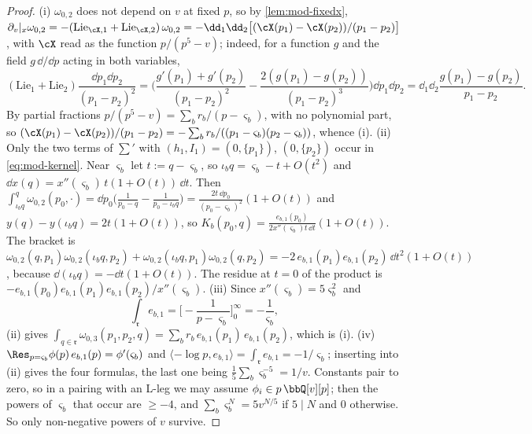\begin{proof}
(i) $\omega_{0,2}$ does not depend on $v$ at fixed $p$, so by \cref{lem:mod-fixedx}, $\partial_v|_x\omega_{0,2}=-(\mathrm{Lie}_{\cX,1}+\mathrm{Lie}_{\cX,2})\,\omega_{0,2}=-\dd_1\dd_2\big[(\cX(p_1)-\cX(p_2))/(p_1-p_2)\big]$, with $\cX$ read as the function $p/(p^5-v)$; indeed, for a function $g$ and the field $g\,\dd/\dd p$ acting in both variables,
\[
(\mathrm{Lie}_{1}+\mathrm{Lie}_{2})\frac{\dd p_1\dd p_2}{(p_1-p_2)^2}=\Big(\frac{g'(p_1)+g'(p_2)}{(p_1-p_2)^2}-\frac{2(g(p_1)-g(p_2))}{(p_1-p_2)^3}\Big)\dd p_1\dd p_2=\dd_1\dd_2\frac{g(p_1)-g(p_2)}{p_1-p_2}.
\]
By partial fractions $p/(p^5-v)=\sum_br_b/(p-\varsigma_b)$, with no polynomial part, so $(\cX(p_1)-\cX(p_2))/(p_1-p_2)=-\sum_br_b/((p_1-\varsigma_b)(p_2-\varsigma_b))$, whence (i).
(ii) Only the two terms of ${\sum}'$ with $(h_1,I_1)=(0,\{p_1\})$, $(0,\{p_2\})$ occur in \eqref{eq:mod-kernel}. Near $\varsigma_b$ let $t:=q-\varsigma_b$, so $\iota_bq=\varsigma_b-t+O(t^2)$ and $\dd x(q)=x''(\varsigma_b)\,t(1+O(t))\,\dd t$. Then $\int_{\iota_bq}^q\omega_{0,2}(p_0,\cdot)=\dd p_0\Big(\frac1{p_0-q}-\frac1{p_0-\iota_bq}\Big)=\frac{2t\,\dd p_0}{(p_0-\varsigma_b)^2}(1+O(t))$ and $y(q)-y(\iota_bq)=2t(1+O(t))$, so $K_b(p_0,q)=\frac{e_{b,1}(p_0)}{2x''(\varsigma_b)t\,\dd t}(1+O(t))$. The bracket is $\omega_{0,2}(q,p_1)\omega_{0,2}(\iota_bq,p_2)+\omega_{0,2}(\iota_bq,p_1)\omega_{0,2}(q,p_2)=-2\,e_{b,1}(p_1)e_{b,1}(p_2)\,\dd t^2(1+O(t))$, because $\dd(\iota_bq)=-\dd t(1+O(t))$. The residue at $t=0$ of the product is $-e_{b,1}(p_0)e_{b,1}(p_1)e_{b,1}(p_2)/x''(\varsigma_b)$.
(iii) Since $x''(\varsigma_b)=5\varsigma_b^2$ and
\[
\int_{\mathfrak r}e_{b,1}=\Big[-\frac{1}{p-\varsigma_b}\Big]_0^\infty=-\frac{1}{\varsigma_b},
\]
(ii) gives $\int_{q\in\mathfrak r}\omega_{0,3}(p_1,p_2,q)=\sum_br_b\,e_{b,1}(p_1)\,e_{b,1}(p_2)$, which is (i).
(iv) $\Res_{p=\varsigma_b}\phi(p)\,e_{b,1}(p)=\phi'(\varsigma_b)$ and $\langle-\log p,e_{b,1}\rangle=\int_{\mathfrak r}e_{b,1}=-1/\varsigma_b$; inserting into (ii) gives the four formulas, the last one being $\frac15\sum_b\varsigma_b^{-5}=1/v$. Constants pair to zero, so in a pairing with an L-leg we may assume $\phi_i\in p\,\bbQ[v][p]$; then the powers of $\varsigma_b$ that occur are $\geq -4$, and $\sum_b\varsigma_b^N=5v^{N/5}$ if $5\mid N$ and $0$ otherwise. So only non-negative powers of $v$ survive.
\end{proof}


